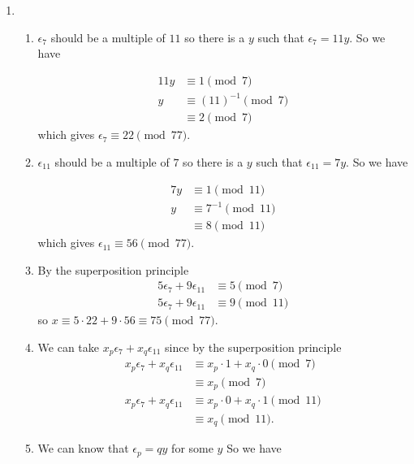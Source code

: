 \begin{solution}
  \begin{enumerate}
    \item
      \begin{enumerate}
        \item
          $\epsilon_7$ should be a multiple of $11$ so there is a $y$ such
          that $\epsilon_7 = 11y$.
          So we have

          \begin{align*}
            11y & \equiv 1 \pmod{7}\\
              y & \equiv (11)^{-1} \pmod{7}\\
                & \equiv 2 \pmod{7}
          \end{align*}
          which gives $\epsilon_7 \equiv 22 \pmod{77}$.
        \item
          $\epsilon_{11}$ should be a multiple of $7$ so there is a $y$ such
          that $\epsilon_{11} = 7y$.
          So we have

          \begin{align*}
            7y & \equiv 1 \pmod{11}\\
             y & \equiv 7^{-1} \pmod{11}\\
               & \equiv 8 \pmod{11}
          \end{align*}
          which gives $\epsilon_{11} \equiv 56 \pmod{77}$.
        \item
          By the superposition principle
          \begin{align*}
            5\epsilon_7 + 9\epsilon_{11} & \equiv 5 \pmod{7}\\
            5\epsilon_7 + 9\epsilon_{11} & \equiv 9 \pmod{11}
          \end{align*}
          so $x \equiv 5 \cdot 22 + 9 \cdot 56 \equiv 75 \pmod{77}$.
        \item
          We can take $x_p\epsilon_7 + x_q\epsilon_{11}$
          since by the superposition principle
          \begin{align*}
            x_p\epsilon_7 + x_q\epsilon_{11} & \equiv x_p \cdot 1 + x_q \cdot 0 \pmod{7}\\
                                             & \equiv x_p \pmod{7}\\
            x_p\epsilon_7 + x_q\epsilon_{11} & \equiv x_p \cdot 0 + x_q \cdot 1 \pmod{11}\\
                                             & \equiv x_q \pmod{11}.
          \end{align*}
        \item
          We can know that $\epsilon_p = qy$ for some $y$
          So we have


\end{enumerate}
\end{enumerate}
\end{solution}
